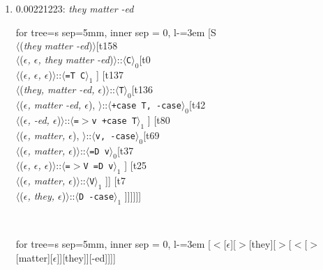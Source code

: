 \documentclass[11pt]{article}
\begin{document}
\begin{enumerate}
	\item  0.00221223: \textit{they matter -ed} \\[0.5em]
	\begin{adjustbox}{max width = \textwidth}
	\begin{forest}
	for tree={s sep=5mm, inner sep = 0, l-=3em}
	[S\\$\langle$(\textit{they matter -ed})$\rangle$[t158\\$\langle$(\textit{$\epsilon${,} $\epsilon${,} they matter -ed})$\rangle$::$\langle$\texttt{C}$\rangle_0$[t0\\$\langle$(\textit{$\epsilon${,} $\epsilon${,} $\epsilon$})$\rangle$::$\langle$\texttt{{=}T C}$\rangle_1$ ] [t137\\$\langle$(\textit{they{,} matter -ed{,} $\epsilon$})$\rangle$::$\langle$\texttt{T}$\rangle_0$[t136\\$\langle$(\textit{$\epsilon${,} matter -ed{,} $\epsilon$}){,} $\rangle$::$\langle$\texttt{+case T{,} -case}$\rangle_0$[t42\\$\langle$(\textit{$\epsilon${,} -ed{,} $\epsilon$})$\rangle$::$\langle$\texttt{{=}$>$v +case T}$\rangle_1$ ] [t80\\$\langle$(\textit{$\epsilon${,} matter{,} $\epsilon$}){,} $\rangle$::$\langle$\texttt{v{,} -case}$\rangle_0$[t69\\$\langle$(\textit{$\epsilon${,} matter{,} $\epsilon$})$\rangle$::$\langle$\texttt{{=}D v}$\rangle_0$[t37\\$\langle$(\textit{$\epsilon${,} $\epsilon${,} $\epsilon$})$\rangle$::$\langle$\texttt{{=}$>$V {=}D v}$\rangle_1$ ] [t25\\$\langle$(\textit{$\epsilon${,} matter{,} $\epsilon$})$\rangle$::$\langle$\texttt{V}$\rangle_1$ ]] [t7\\$\langle$(\textit{$\epsilon${,} they{,} $\epsilon$})$\rangle$::$\langle$\texttt{D -case}$\rangle_1$ ]]]]]]
	\end{forest}
	\end{adjustbox}
	\\
	\begin{adjustbox}{max width = \textwidth}
	\begin{forest}
	for tree={s sep=5mm, inner sep = 0, l-=3em}
	[$<$[$\epsilon$][$>$[they][$>$[$<$[$>$[matter][$\epsilon$]][they]][-ed]]]]
	\end{forest}
	\end{adjustbox}
	\newpage


\end{enumerate}
\end{document}
